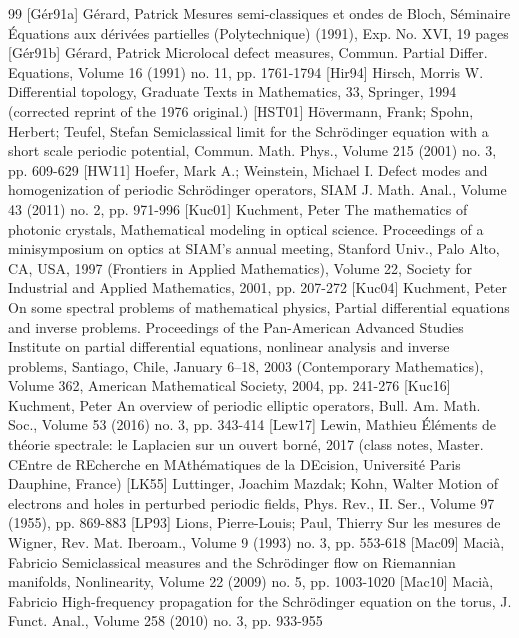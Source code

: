 \documentclass[10pt]{amsart}
\theoremstyle{definition}
\numberwithin{equation}{section}
\begin{document}
\begin{thebibliography}{99}
 [Gér91a] Gérard, Patrick Mesures semi-classiques et ondes de Bloch, Séminaire Équations aux dérivées partielles (Polytechnique) (1991), Exp. No. XVI, 19 pages
 [Gér91b] Gérard, Patrick Microlocal defect measures, Commun. Partial Differ. Equations, Volume 16 (1991) no. 11, pp. 1761-1794
 [Hir94] Hirsch, Morris W. Differential topology, Graduate Texts in Mathematics, 33, Springer, 1994 (corrected reprint of the 1976 original.)
 [HST01] Hövermann, Frank; Spohn, Herbert; Teufel, Stefan Semiclassical limit for the Schrödinger equation with a short scale periodic potential, Commun. Math. Phys., Volume 215 (2001) no. 3, pp. 609-629
 [HW11] Hoefer, Mark A.; Weinstein, Michael I. Defect modes and homogenization of periodic Schrödinger operators, SIAM J. Math. Anal., Volume 43 (2011) no. 2, pp. 971-996
 [Kuc01] Kuchment, Peter The mathematics of photonic crystals, Mathematical modeling in optical science. Proceedings of a minisymposium on optics at SIAM’s annual meeting, Stanford Univ., Palo Alto, CA, USA, 1997 (Frontiers in Applied Mathematics), Volume 22, Society for Industrial and Applied Mathematics, 2001, pp. 207-272
 [Kuc04] Kuchment, Peter On some spectral problems of mathematical physics, Partial differential equations and inverse problems. Proceedings of the Pan-American Advanced Studies Institute on partial differential equations, nonlinear analysis and inverse problems, Santiago, Chile, January 6–18, 2003 (Contemporary Mathematics), Volume 362, American Mathematical Society, 2004, pp. 241-276
 [Kuc16] Kuchment, Peter An overview of periodic elliptic operators, Bull. Am. Math. Soc., Volume 53 (2016) no. 3, pp. 343-414
 [Lew17] Lewin, Mathieu Éléments de théorie spectrale: le Laplacien sur un ouvert borné, 2017 (class notes, Master. CEntre de REcherche en MAthématiques de la DEcision, Université Paris Dauphine, France)
 [LK55] Luttinger, Joachim Mazdak; Kohn, Walter Motion of electrons and holes in perturbed periodic fields, Phys. Rev., II. Ser., Volume 97 (1955), pp. 869-883
 [LP93] Lions, Pierre-Louis; Paul, Thierry Sur les mesures de Wigner, Rev. Mat. Iberoam., Volume 9 (1993) no. 3, pp. 553-618
 [Mac09] Macià, Fabricio Semiclassical measures and the Schrödinger flow on Riemannian manifolds, Nonlinearity, Volume 22 (2009) no. 5, pp. 1003-1020
 [Mac10] Macià, Fabricio High-frequency propagation for the Schrödinger equation on the torus, J. Funct. Anal., Volume 258 (2010) no. 3, pp. 933-955

\end{thebibliography}
\end{document}
